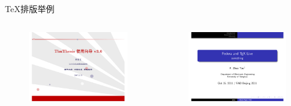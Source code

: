 \documentclass[xcolor=table,svgnames]{beamer}
\begin{document}
\begin{frame}{\TeX{}排版举例}
  \begin{columns}
    \begin{column}{.45\textwidth}
      \begin{figure}[h]
        \centering
        \includegraphics[width=\textwidth]{slides-powerdot.pdf}
      \end{figure}
    \end{column}
    \begin{column}{.45\textwidth}
      \begin{figure}[h]
        \centering
        \includegraphics[width=\textwidth]{slides-beamer.pdf}
      \end{figure}
    \end{column}
  \end{columns}
\end{frame}
\end{document}
